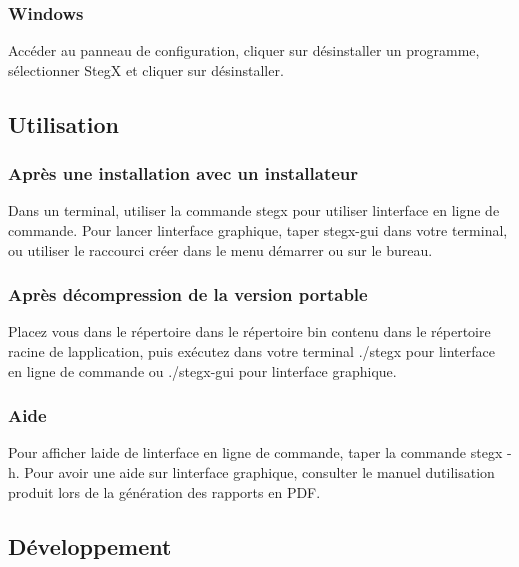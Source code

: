 \subsubsection*{Windows }

Accéder au panneau de configuration, cliquer sur désinstaller un programme, sélectionner {\ttfamily StegX} et cliquer sur désinstaller. 



\subsection*{Utilisation }

\subsubsection*{Après une installation avec un installateur }

Dans un terminal, utiliser la commande {\ttfamily stegx} pour utiliser l\textquotesingle{}interface en ligne de commande. Pour lancer l\textquotesingle{}interface graphique, taper {\ttfamily stegx-\/gui} dans votre terminal, ou utiliser le raccourci créer dans le menu démarrer ou sur le bureau.

\subsubsection*{Après décompression de la version portable }

Placez vous dans le répertoire dans le répertoire {\ttfamily bin} contenu dans le répertoire racine de l\textquotesingle{}application, puis exécutez dans votre terminal {\ttfamily ./stegx} pour l\textquotesingle{}interface en ligne de commande ou {\ttfamily ./stegx-\/gui} pour l\textquotesingle{}interface graphique.

\subsubsection*{Aide }

Pour afficher l\textquotesingle{}aide de l\textquotesingle{}interface en ligne de commande, taper la commande {\ttfamily stegx -\/h}. Pour avoir une aide sur l\textquotesingle{}interface graphique, consulter le manuel d\textquotesingle{}utilisation produit lors de la génération des rapports en P\+DF. 



\subsection*{Développement }

